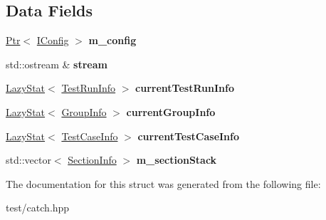 \subsection*{Data Fields}
\begin{DoxyCompactItemize}
\item 
\hyperlink{classCatch_1_1Ptr}{Ptr}$<$ \hyperlink{structCatch_1_1IConfig}{I\+Config} $>$ {\bfseries m\+\_\+config}\hypertarget{structCatch_1_1StreamingReporterBase_a7d77cac272194543ed81dea9f5c4f3a0}{}\label{structCatch_1_1StreamingReporterBase_a7d77cac272194543ed81dea9f5c4f3a0}

\item 
std\+::ostream \& {\bfseries stream}\hypertarget{structCatch_1_1StreamingReporterBase_aee935c9ec91eca10af8598a88258bde4}{}\label{structCatch_1_1StreamingReporterBase_aee935c9ec91eca10af8598a88258bde4}

\item 
\hyperlink{structCatch_1_1LazyStat}{Lazy\+Stat}$<$ \hyperlink{structCatch_1_1TestRunInfo}{Test\+Run\+Info} $>$ {\bfseries current\+Test\+Run\+Info}\hypertarget{structCatch_1_1StreamingReporterBase_af4d83c6abacdbcc7790497f0d50545af}{}\label{structCatch_1_1StreamingReporterBase_af4d83c6abacdbcc7790497f0d50545af}

\item 
\hyperlink{structCatch_1_1LazyStat}{Lazy\+Stat}$<$ \hyperlink{structCatch_1_1GroupInfo}{Group\+Info} $>$ {\bfseries current\+Group\+Info}\hypertarget{structCatch_1_1StreamingReporterBase_aae9f9ccd5346f51d378fc19d5de5d868}{}\label{structCatch_1_1StreamingReporterBase_aae9f9ccd5346f51d378fc19d5de5d868}

\item 
\hyperlink{structCatch_1_1LazyStat}{Lazy\+Stat}$<$ \hyperlink{structCatch_1_1TestCaseInfo}{Test\+Case\+Info} $>$ {\bfseries current\+Test\+Case\+Info}\hypertarget{structCatch_1_1StreamingReporterBase_a8bd70da6d93c21962a2628c3e84991b5}{}\label{structCatch_1_1StreamingReporterBase_a8bd70da6d93c21962a2628c3e84991b5}

\item 
std\+::vector$<$ \hyperlink{structCatch_1_1SectionInfo}{Section\+Info} $>$ {\bfseries m\+\_\+section\+Stack}\hypertarget{structCatch_1_1StreamingReporterBase_a82f2a7a5dec58bc093f6ab26a9e47bd8}{}\label{structCatch_1_1StreamingReporterBase_a82f2a7a5dec58bc093f6ab26a9e47bd8}

\end{DoxyCompactItemize}


The documentation for this struct was generated from the following file\+:\begin{DoxyCompactItemize}
\item 
test/catch.\+hpp\end{DoxyCompactItemize}
